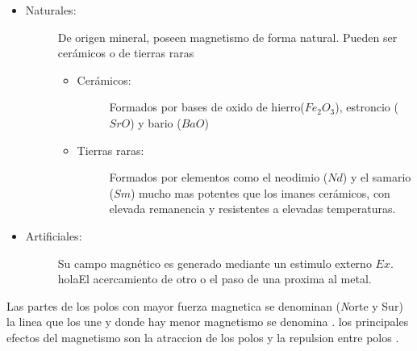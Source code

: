 \documentclass{report}
\begin{document}
 \begin{itemize}
   \item\begin{description}
       \item[Naturales: ] De origen mineral, poseen magnetismo de forma natural. Pueden ser cerámicos o de tierras raras
         \begin{itemize}
           \item\begin{description}
               \item[Cerámicos: ] Formados por bases de oxido de hierro(\(\mathit{Fe_2O_3}\)), estroncio (\(\mathit{SrO}\)) y bario (\(\mathit{BaO}\))   
           \end{description} 
         \item\begin{description}
             \item[Tierras raras: ] Formados por elementos como el neodimio (\(\mathit{Nd}\)) y el samario (\(\mathit{Sm}\)) mucho mas potentes que los 
               imanes cerámicos, con elevada remanencia y resistentes a elevadas temperaturas.  
         \end{description}
         \end{itemize}
    \end{description}
    \item\begin{description}
        \item[Artificiales: ] Su campo magnético es generado mediante un estimulo externo \(\mathit{Ex.}\) holaEl acercamiento de 
        otro{} o el paso de una {} proxima al metal.
    \end{description}
\end{itemize}
Las partes de los polos con mayor fuerza magnetica se denominan {} ({\emph Norte y Sur}) la linea que los une y donde 
hay menor magnetismo se denomina {}.
los principales efectos del magnetismo son la atraccion de los polos {} y la repulsion entre polos {}.
\end{document}
